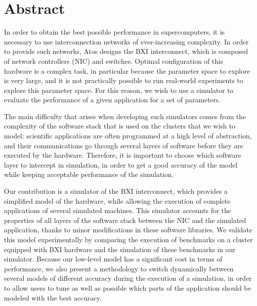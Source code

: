 
\makeatletter
\@openrightfalse

\chapter*{Abstract}

In order to obtain the best possible performance in supercomputers, it is
necessary to use interconnection networks of ever-increasing complexity. In
order to provide such networks, Atos designs the BXI interconnect, which is
composed of network controllers (NIC) and switches. Optimal configuration of
this hardware is a complex task, in particular because the parameter space to
explore is very large, and it is not practically possible to run real-world
experiments to explore this parameter space. For this reason, we wish to use a
simulator to evaluate the performance of a given application for a set of
parameters.

The main difficulty that arises when developing such simulators comes from the
complexity of the software stack that is used on the clusters that we wish to
model: scientific applications are often programmed at a high level of
abstraction, and their communications go through several layers of software
before they are executed by the hardware. Therefore, it is important to choose
which software layer to intercept in simulation, in order to get a good accuracy
of the model while keeping acceptable performance of the simulation.

Our contribution is a simulator of the BXI interconnect, which provides a
simplified model of the hardware, while allowing the execution of complete
applications of several simulated machines. This simulator accounts for the
properties of all layers of the software stack between the NIC and the simulated
application, thanks to minor modifications in these software libraries. We
validate this model experimentally by comparing the execution of benchmarks on a
cluster equipped with BXI hardware and the simulation of these benchmarks in our
simulator. Because our low-level model has a significant cost in terms of
performance, we also present a methodology to switch dynamically between several
models of different accuracy during the execution of a simulation, in order to
allow users to tune as well as possible which parts of the application should be
modeled with the best accuracy.

\@openrighttrue
\makeatother
